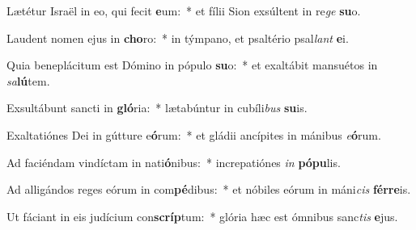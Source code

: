 \item Lætétur Israël in eo, qui fecit \textbf{e}um:~* et fílii Sion exsúltent in re\textit{ge} \textbf{su}o.
\item Laudent nomen ejus in \textbf{cho}ro:~* in týmpano, et psaltério psal\textit{lant} \textbf{e}i.
\item Quia beneplácitum est Dómino in pópulo \textbf{su}o:~* et exaltábit mansuétos in \textit{sa}\textbf{lú}tem.
\item Exsultábunt sancti in \textbf{gló}ria:~* lætabúntur in cubíli\textit{bus} \textbf{su}is.
\item Exaltatiónes Dei in gútture e\textbf{ó}rum:~* et gládii ancípites in mánibus \textit{e}\textbf{ó}rum.
\item Ad faciéndam vindíctam in nati\textbf{ó}nibus:~* increpatiónes \textit{in} \textbf{pó}\textbf{pu}lis.
\item Ad alligándos reges eórum in com\textbf{pé}dibus:~* et nóbiles eórum in máni\textit{cis} \textbf{fér}\textbf{re}is.
\item Ut fáciant in eis judícium con\textbf{scríp}tum:~* glória hæc est ómnibus sanc\textit{tis} \textbf{e}jus.
